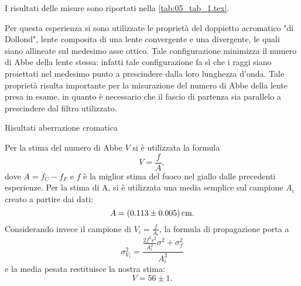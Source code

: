 I risultati delle misure sono riportati nella \autoref{tab:05_tab_1.tex}.

Per questa esperienza si sono utilizzate le propriet\`a del doppietto 
acromatico "di Dollond", lente composita di una lente convergente e una 
divergente, le quali siano allineate sul medesimo asse ottico. Tale 
configurazione minimizza il numero di Abbe della lente stessa: infatti 
tale configurazione fa s\`i che i raggi siano proiettati nel medesimo 
punto a prescindere dalla loro lunghezza d'onda. Tale propriet\`a risulta 
importante per la misurazione del numero di Abbe della lente presa in esame, 
in quanto \`e necessario che il fascio di partenza sia parallelo a 
prescindere dal filtro utilizzato.
\begin{tabella}
	\centering
	
	\caption{Risultati aberrazione cromatica}
	\label{tab:05_tab_1.tex}
\end{tabella}

Per la stima del numero di Abbe $V$ si \`e utilizzata la formula
\[ V=\frac{f}{A} ,\]
dove \(A= f_C - f_F\) e $f$ \`e la miglior stima del fuoco nel giallo dalle precedenti esperienze. %
Per la stima di A, si \`e utilizzata una media semplice sul campione ${A_i}$ creato a partire dai dati:
\[ A = (0.113 \pm 0.005) \,\mathrm{cm} .\]
Considerando invece il campione di \( V_i=\frac{f}{A_i} \), la formula di propagazione porta a 
\[  \sigma^2_{V_i} = \frac{
\frac{2f^2   s^2}{A_i^2}   \sigma^2 +  \sigma^2_{f}
}{A_i^2} \]
e la media pesata restituisce la nostra stima:
\[V= 56 \pm 1 .\]
